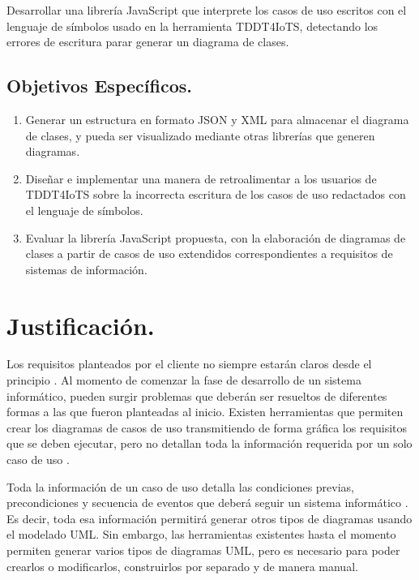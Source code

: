 Desarrollar una librería JavaScript que interprete los casos de uso escritos con el lenguaje de símbolos usado en la herramienta TDDT4IoTS, detectando los errores de escritura parar generar un diagrama de clases. 

\subsection{Objetivos Específicos.}

\begin{enumerate}
	\item Generar un estructura en formato JSON y XML para almacenar el diagrama de clases, y pueda ser visualizado mediante otras librerías que generen diagramas.
	
	\item Diseñar e implementar una manera de retroalimentar a los usuarios de TDDT4IoTS sobre la incorrecta escritura de los casos de uso redactados con el lenguaje de símbolos. 
	
	\item Evaluar la librería JavaScript propuesta, con la elaboración de diagramas de clases a partir de casos de uso extendidos correspondientes a requisitos de sistemas de información.
\end{enumerate}

\section{Justificación.}

Los requisitos planteados por el cliente no siempre estarán claros desde el principio \parencite{iqbal2020}. Al momento de comenzar la fase de desarrollo de un sistema informático, pueden surgir problemas que deberán ser resueltos de diferentes formas a las que fueron planteadas al inicio. Existen herramientas que permiten crear los diagramas de casos de uso transmitiendo de forma gráfica los requisitos que se deben ejecutar, pero no detallan toda la información requerida por un solo caso de uso \parencite{Abdelnabi2021}.

Toda la información de un caso de uso detalla las condiciones previas, precondiciones y secuencia de eventos que deberá seguir un sistema informático \parencite{iqbal2020}. Es decir, toda esa información permitirá generar otros tipos de diagramas usando el modelado UML. Sin embargo, las herramientas existentes hasta el momento permiten generar varios tipos de diagramas UML, pero es necesario para poder crearlos o modificarlos, construirlos por separado y de manera manual.

